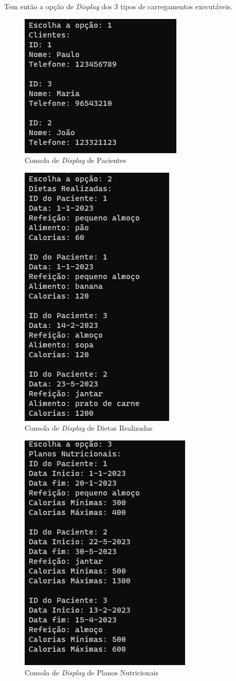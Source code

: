 \documentclass{article}
\begin{document}
Tem então a opção de \emph{Display} dos 3 tipos de carregamentos executáveis.

\begin{figure}[hbt!]
    \centering
    \includegraphics[width=0.4\linewidth]{DisplayClientes.png}
    \caption{Consola de \emph{Display} de Pacientes}
    \label{fig:enter-label}
\end{figure}

\begin{figure}[hbt!]
    \centering
    \includegraphics[width=0.3\linewidth]{DispalyDietas.png}
    \caption{Consola de \emph{Display} de Dietas Realizadas}
    \label{fig:enter-label}
\end{figure}

\begin{figure}[hbt!]
    \centering
    \includegraphics[width=0.4\linewidth]{DisplayPlanos.png}
    \caption{Consola de \emph{Display} de Planos Nutricionais}
    \label{fig:enter-label}
\end{figure}
\end{document}
